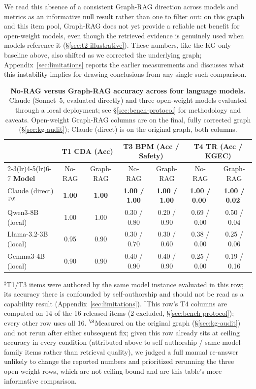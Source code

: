 \documentclass{article}
\begin{document}
We read this absence of a consistent Graph-RAG direction across models and metrics as an informative null result rather than one to filter out: on this graph and this item pool, Graph-RAG does not yet provide a reliable net benefit for open-weight models, even though the retrieved evidence is genuinely used when models reference it (\S\ref{sec:t2-illustrative}). These numbers, like the KG-only baseline above, also shifted as we corrected the underlying graph; Appendix~\ref{sec:limitations} reports the earlier measurements and discusses what this instability implies for drawing conclusions from any single such comparison.

\begin{table}[t]
\centering
\caption{\textbf{No-RAG versus Graph-RAG accuracy across four language models.} Claude (Sonnet~5, evaluated directly) and three open-weight models evaluated through a local deployment; see \S\ref{sec:bench-protocol} for methodology and caveats. Open-weight Graph-RAG columns are on the final, fully corrected graph (\S\ref{sec:kg-audit}); Claude (direct) is on the original graph, both columns.}
\label{tab:bench}
\small
\begin{tabular}{l cc cc cc}
\toprule
& \multicolumn{2}{c}{\textbf{T1 CDA (Acc)}} & \multicolumn{2}{c}{\textbf{T3 BPM (Acc / Safety)}} & \multicolumn{2}{c}{\textbf{T4 TR (Acc / KGEC)}} \\
\cmidrule(lr){2-3}\cmidrule(lr){4-5}\cmidrule(lr){6-7}
\textbf{Model} & No-RAG & Graph-RAG & No-RAG & Graph-RAG & No-RAG & Graph-RAG \\
\midrule
Claude (direct)$^{\ddagger\S}$ & \textbf{1.00} & \textbf{1.00} & \textbf{1.00 / 1.00} & \textbf{1.00 / 1.00} & \textbf{1.00 / 0.00}$^{\dagger}$ & \textbf{1.00 / 0.02}$^{\dagger}$ \\
Qwen3-8B (local)         & 1.00 & 1.00 & 0.30 / 0.80 & 0.20 / 0.90 & 0.69 / 0.00 & 0.50 / 0.04 \\
Llama-3.2-3B (local)     & 0.95 & 0.90 & 0.30 / 0.70 & 0.30 / 0.60 & 0.38 / 0.00 & 0.25 / 0.06 \\
Gemma3-4B (local)        & 0.90 & 0.90 & 0.40 / 0.90 & 0.40 / 0.90 & 0.25 / 0.00 & 0.19 / 0.16 \\
\bottomrule
\end{tabular}

\vspace{4pt}
\footnotesize $^{\ddagger}$T1/T3 items were authored by the same model instance evaluated in this row; its accuracy there is confounded by self-authorship and should not be read as a capability result (Appendix~\ref{sec:limitations}). $^{\dagger}$This row's T4 columns are computed on 14 of the 16 released items (2 excluded, \S\ref{sec:bench-protocol}); every other row uses all 16. $^{\S}$Measured on the original graph (\S\ref{sec:kg-audit}) and not rerun after either subsequent fix; given this row already sits at ceiling accuracy in every condition (attributed above to self-authorship / same-model-family items rather than retrieval quality), we judged a full manual re-answer unlikely to change the reported numbers and prioritized rerunning the three open-weight rows, which are not ceiling-bound and are this table's more informative comparison.
\end{table}
\end{document}
